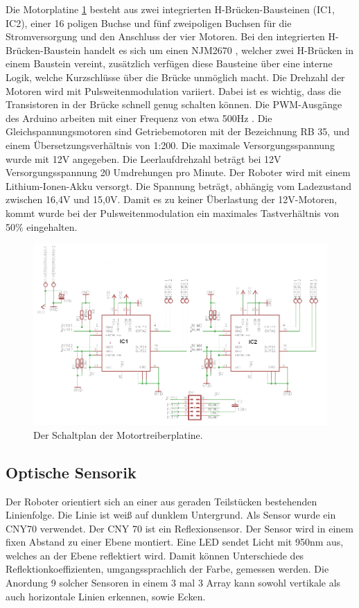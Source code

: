 \documentclass[a4paper,bibtotoc,oneside]{scrbook}
\begin{document}
Die Motorplatine \ref{hbridge2} besteht aus zwei integrierten H-Brücken-Bausteinen (IC1, IC2), einer 16 poligen Buchse und fünf zweipoligen Buchsen für die Stromversorgung und den Anschluss der vier Motoren. Bei den integrierten H-Brücken-Baustein handelt es sich um einen NJM2670 \cite{njm}, welcher zwei H-Brücken in einem Baustein vereint, zusätzlich verfügen diese Bausteine über eine interne Logik, welche Kurzschlüsse über die Brücke unmöglich macht.
Die Drehzahl der Motoren wird mit Pulsweitenmodulation variiert. Dabei ist es wichtig, dass die Transistoren in der Brücke schnell genug schalten können. Die PWM-Ausgänge des Arduino arbeiten mit einer Frequenz von etwa 500Hz \cite{pwm}.
Die Gleichspannungsmotoren sind Getriebemotoren mit der Bezeichnung RB 35, und einem Übersetzungsverhältnis von 1:200. Die maximale Versorgungsspannung wurde mit 12V angegeben. Die Leerlaufdrehzahl beträgt bei 12V Versorgungsspannung 20 Umdrehungen pro Minute.
Der Roboter wird mit einem Lithium-Ionen-Akku versorgt. Die Spannung beträgt, abhängig vom Ladezustand zwischen 16,4V und 15,0V. Damit es zu keiner Überlastung der 12V-Motoren, kommt wurde bei der Pulsweitenmodulation ein maximales Tastverhältnis von 50\% eingehalten.
 

\begin{figure}[htbp]
\centering
\includegraphics[width=150mm]{img/HBrucke.png}
\caption{Der Schaltplan der Motortreiberplatine.}\label{hbridge2}
\end{figure}


\subsection{Optische Sensorik}\thispagestyle{empty}
Der Roboter orientiert sich an einer aus geraden Teilstücken bestehenden Linienfolge. Die Linie ist weiß auf dunklem Untergrund.
Als Sensor wurde ein CNY70 verwendet. Der CNY 70 ist ein Reflexionsensor. Der Sensor wird in einem fixen Abstand zu einer Ebene montiert. Eine LED sendet Licht mit 950nm aus, welches an der Ebene reflektiert wird. Damit können Unterschiede des Reflektionkoeffizienten, umgangssprachlich der Farbe, gemessen werden. Die Anordung 9 solcher Sensoren in einem 3 mal 3 Array kann sowohl vertikale als auch horizontale Linien erkennen, sowie Ecken.
\end{document}
